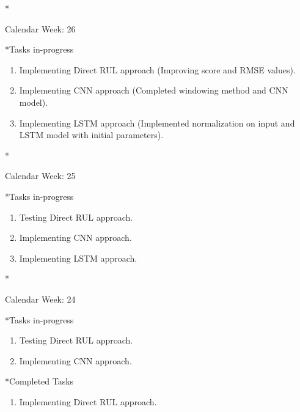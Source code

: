 \documentclass[11pt,a4paper]{article}
\begin{document}
\newpage
\begin{section}*{Calendar Week: 26  \hfill \date{02 July, 2021}}
 \begin{refsection}
     \begin{subsection}*{Tasks in-progress}
         \begin{enumerate}
             \item Implementing Direct RUL approach (Improving score and RMSE values).
             \item Implementing CNN approach (Completed windowing method and CNN model).
             \item Implementing LSTM approach (Implemented normalization on input and LSTM model with initial parameters).
         \end{enumerate}
     \end{subsection}
 \end{refsection}
\end{section}
\newpage
\begin{section}*{Calendar Week: 25  \hfill \date{25 June, 2021}}
 \begin{refsection}
     \begin{subsection}*{Tasks in-progress}
         \begin{enumerate}
             \item Testing Direct RUL approach.
             \item Implementing CNN approach.
             \item Implementing LSTM approach.
         \end{enumerate}
     \end{subsection}
 \end{refsection}
\end{section}
\newpage
\begin{section}*{Calendar Week: 24  \hfill \date{18 June, 2021}}
 \begin{refsection}
     \begin{subsection}*{Tasks in-progress}
         \begin{enumerate}
             \item Testing Direct RUL approach.
             \item Implementing CNN approach.
         \end{enumerate}
     \end{subsection}
     \begin{subsection}*{Completed Tasks}
         \begin{enumerate}
             \item Implementing Direct RUL approach.
         \end{enumerate}
     \end{subsection}
 \end{refsection}
\end{section}
\end{document}
